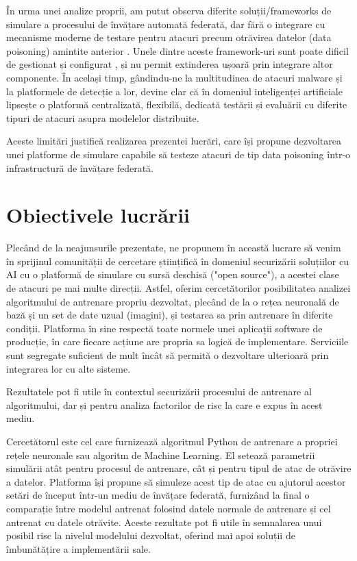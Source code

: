 \documentclass[../../main.tex]{subfiles}
\begin{document}
În urma unei analize proprii, am putut observa diferite soluții/frameworks de simulare a procesului de învățare automată federată, dar fără o integrare cu mecanisme moderne de testare pentru atacuri
precum otrăvirea datelor (data poisoning) amintite anterior \cite{ibmfl_api}. Unele dintre aceste framework-uri sunt poate dificil de gestionat și configurat \cite{ibmfl_github}, și nu permit extinderea ușoară prin integrare altor componente.
În același timp, gândindu-ne la multitudinea de atacuri malware și la platformele de detecție a lor, devine clar că în domeniul inteligenței artificiale lipsește o platformă centralizată, flexibilă, dedicată testării și evaluării cu diferite tipuri de atacuri asupra modelelor distribuite.

Aceste limitări justifică realizarea prezentei lucrări, care își propune dezvoltarea unei platforme de simulare capabile să testeze atacuri de tip data poisoning într-o infrastructură de învățare federată.

\section{Obiectivele lucrării}

Plecând de la neajunsurile prezentate, ne propunem în această lucrare să venim în sprijinul comunității de cercetare științifică în domeniul securizării soluțiilor cu AI cu o platformă de simulare cu sursă deschisă ("open source"), a acestei clase de atacuri pe mai multe direcții.
Astfel, oferim cercetătorilor posibilitatea analizei algoritmului de antrenare propriu dezvoltat, plecând de la o rețea neuronală de bază și un set de date uzual (imagini), și testarea sa prin antrenare în diferite condiții.
Platforma în sine respectă toate normele unei aplicații software de producție, în care fiecare acțiune are propria sa logică de implementare.
Serviciile sunt segregate suficient de mult încât să permită o dezvoltare ulterioară prin integrarea lor cu alte sisteme.

Rezultatele pot fi utile în contextul securizării procesului de antrenare al algoritmului, dar și pentru analiza factorilor de risc la care e expus în acest mediu.

Cercetătorul este cel care furnizează algoritmul Python de antrenare a propriei rețele neuronale sau algoritm de Machine Learning. El setează parametrii simulării atât pentru procesul de antrenare, cât și pentru tipul de atac de otrăvire a datelor.
Platforma își propune să simuleze acest tip de atac cu ajutorul acestor setări de început într-un mediu de învățare federată, furnizând la final o comparație între modelul antrenat folosind datele normale de antrenare și cel antrenat cu datele otrăvite.
Aceste rezultate pot fi utile în semnalarea unui posibil risc la nivelul modelului dezvoltat, oferind mai apoi soluții de îmbunătățire a implementării sale.
\end{document}
